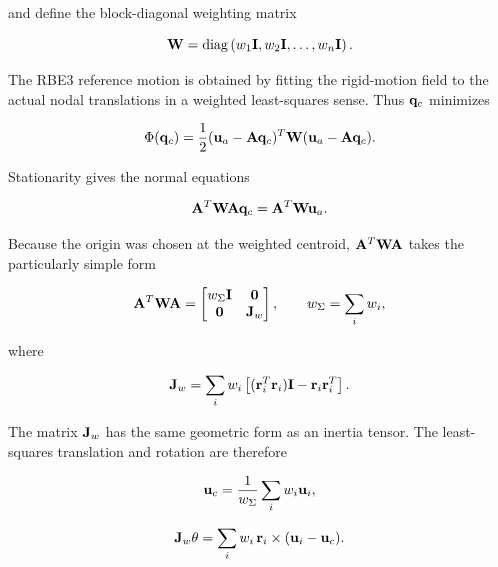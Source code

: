 and define the block-diagonal weighting matrix

\begin{equation}
    \mathbf{W}=\operatorname{diag}
    \left(w_1\mathbf{I},w_2\mathbf{I},\ldots,w_n\mathbf{I}\right).
\end{equation}

The RBE3 reference motion is obtained by fitting the rigid-motion field to the
actual nodal translations in a weighted least-squares sense. Thus $\mathbf{q}_c$
minimizes

\begin{equation}\label{rbe3-least-squares-functional}
    \Phi(\mathbf{q}_c)
    =\frac{1}{2}
    (\mathbf{u}_a-\mathbf{A}\mathbf{q}_c)^T
    \mathbf{W}
    (\mathbf{u}_a-\mathbf{A}\mathbf{q}_c).
\end{equation}

Stationarity gives the normal equations

\begin{equation}\label{rbe3-normal-equations}
    \mathbf{A}^T\mathbf{W}\mathbf{A}\mathbf{q}_c
    =\mathbf{A}^T\mathbf{W}\mathbf{u}_a.
\end{equation}

Because the origin was chosen at the weighted centroid,
$\mathbf{A}^T\mathbf{W}\mathbf{A}$ takes the particularly simple form

\begin{equation}\label{rbe3-normal-matrix}
    \mathbf{A}^T\mathbf{W}\mathbf{A}
    =\begin{bmatrix}
        w_\Sigma\mathbf{I}&\mathbf{0}\\
        \mathbf{0}&\mathbf{J}_w
    \end{bmatrix},
    \qquad
    w_\Sigma=\sum_i w_i,
\end{equation}

where

\begin{equation}\label{rbe3-geometric-inertia}
    \mathbf{J}_w = \sum_i w_i
    \left[(\mathbf{r}_i^T\mathbf{r}_i)\mathbf{I}-\mathbf{r}_i\mathbf{r}_i^T\right].
\end{equation}

The matrix $\mathbf{J}_w$ has the same geometric form as an inertia tensor. The
least-squares translation and rotation are therefore

\begin{equation}\label{rbe3-average-translation}
    \mathbf{u}_c = \frac{1}{w_\Sigma}\sum_i w_i\mathbf{u}_i,
\end{equation}

\begin{equation}\label{rbe3-rotation-normal-equations}
    \mathbf{J}_w\mathbf{\theta}
    = \sum_i w_i\,\mathbf{r}_i\times(\mathbf{u}_i-\mathbf{u}_c).
\end{equation}

